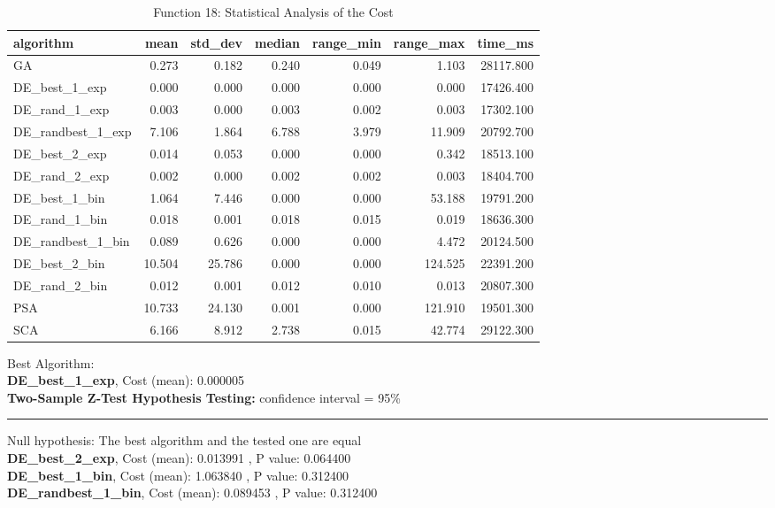 \documentclass[12pt]{article}
\begin{document}
\begin{table}[H]
    \centering
    \footnotesize
\begin{tabular}{lrrrrrr}
\toprule
         algorithm &   mean &  std\_dev &  median &  range\_min &  range\_max &   time\_ms \\
\midrule
                GA &  0.273 &    0.182 &   0.240 &      0.049 &      1.103 & 28117.800 \\
     DE\_best\_1\_exp &  0.000 &    0.000 &   0.000 &      0.000 &      0.000 & 17426.400 \\
     DE\_rand\_1\_exp &  0.003 &    0.000 &   0.003 &      0.002 &      0.003 & 17302.100 \\
 DE\_randbest\_1\_exp &  7.106 &    1.864 &   6.788 &      3.979 &     11.909 & 20792.700 \\
     DE\_best\_2\_exp &  0.014 &    0.053 &   0.000 &      0.000 &      0.342 & 18513.100 \\
     DE\_rand\_2\_exp &  0.002 &    0.000 &   0.002 &      0.002 &      0.003 & 18404.700 \\
     DE\_best\_1\_bin &  1.064 &    7.446 &   0.000 &      0.000 &     53.188 & 19791.200 \\
     DE\_rand\_1\_bin &  0.018 &    0.001 &   0.018 &      0.015 &      0.019 & 18636.300 \\
 DE\_randbest\_1\_bin &  0.089 &    0.626 &   0.000 &      0.000 &      4.472 & 20124.500 \\
     DE\_best\_2\_bin & 10.504 &   25.786 &   0.000 &      0.000 &    124.525 & 22391.200 \\
     DE\_rand\_2\_bin &  0.012 &    0.001 &   0.012 &      0.010 &      0.013 & 20807.300 \\
               PSA & 10.733 &   24.130 &   0.001 &      0.000 &    121.910 & 19501.300 \\
               SCA &  6.166 &    8.912 &   2.738 &      0.015 &     42.774 & 29122.300 \\
\bottomrule
\end{tabular}

\caption{Function 18: Statistical Analysis of the Cost} 
    \end{table}
Best Algorithm: \\
\textbf{DE\_best\_1\_exp}, Cost (mean): 0.000005\\
\noindent
\textbf{Two-Sample Z-Test Hypothesis Testing: }
confidence interval = 95\%\\
\vspace{-3mm}
\rule[3mm]{\linewidth}{0.2pt}
Null hypothesis: The best algorithm and the tested one are equal\\
\textbf{DE\_best\_2\_exp}, Cost (mean): 0.013991
, P value: 0.064400\\
\textbf{DE\_best\_1\_bin}, Cost (mean): 1.063840
, P value: 0.312400\\
\textbf{DE\_randbest\_1\_bin}, Cost (mean): 0.089453
, P value: 0.312400\\
\end{document}
